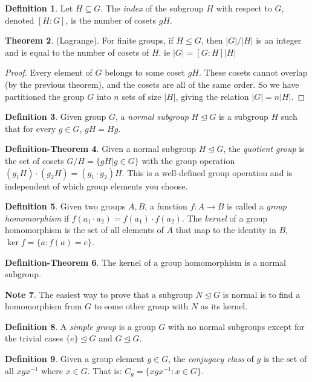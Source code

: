 \documentclass[12pt, letterpaper]{article}
\theoremstyle{definition} %
\newtheorem{thm}{Theorem}[section] %
\newtheorem{defn}[thm]{Definition} %
\newtheorem{defnthm}[thm]{Definition-Theorem}
\newtheorem{note}[thm]{Note}
\begin{document}
\begin{defn}
  Let $H\subseteq G$. The \emph{index} of the subgroup $H$ with respect to $G$, denoted $[H:G]$, is the number of cosets $gH$.
\end{defn}
\begin{thm}
  (Lagrange). For finite groups, if $H\leq G$, then $|G|/|H|$ is an integer and is equal to the number of cosets of $H$. 
  ie $|G|=[G:H]|H|$
\end{thm}
\begin{proof}
  Every element of $G$ belongs to some coset $gH$. These cosets cannot overlap (by the previous theorem), and the cosets are all
  of the same order. So we have partitioned the group $G$ into $n$ sets of size $|H|$, giving the relation $|G|=n|H|$. 
\end{proof}
\begin{defn}
  Given group $G $, a \emph{normal subgroup} $H\mathrel{\unlhd}G$ is a subgroup $H$ such that for every $g\in G$, $gH=Hg$.
\end{defn}
\begin{defnthm}
  Given a normal subgroup $H\mathrel{\unlhd}G$, the \emph{quotient group} is the set of cosets $G/H=\{gH | g\in G\}$ with the
  group operation $(g_1 H)\cdot(g_2 H)=(g_1\cdot g_2)H$. This is a well-defined group operation and is independent of which group elements
  you choose.
\end{defnthm}
\begin{defn}
  Given two groups $A,B$, a function $f:A\to B$ is called a \emph{group homomorphism} if
  $f(a_1\cdot a_2)=f(a_1)\cdot f(a_2)$. The \emph{kernel} of a group homomorphism is the 
  set of all elements of $A$ that map to the identity in $B$, $\ker f=\{a : f(a)=e\}$.
\end{defn}
\begin{defnthm}
  The kernel of a group homomorphism is a normal subgroup. 
\end{defnthm}
\begin{note}
  The easiest way to prove that a subgroup $N\mathrel{\unlhd}G$ is normal is to find a 
  homomorphism from $G$ to some other group with $N$ as its kernel.
\end{note}
\begin{defn}
  A \emph{simple group} is a group $G$ with no normal subgroups except for the trivial cases $\{e\}\mathrel{\unlhd} G$ and $G\mathrel{\unlhd}G$.
\end{defn}
\begin{defn}
  Given a group element $g\in G$, the \emph{conjugacy class} of $g$ is the set of all $xgx^{-1}$ where $x\in G$. That is: $C_g=\{x g x^{-1} : x\in G\}$.
\end{defn}
\end{document}
